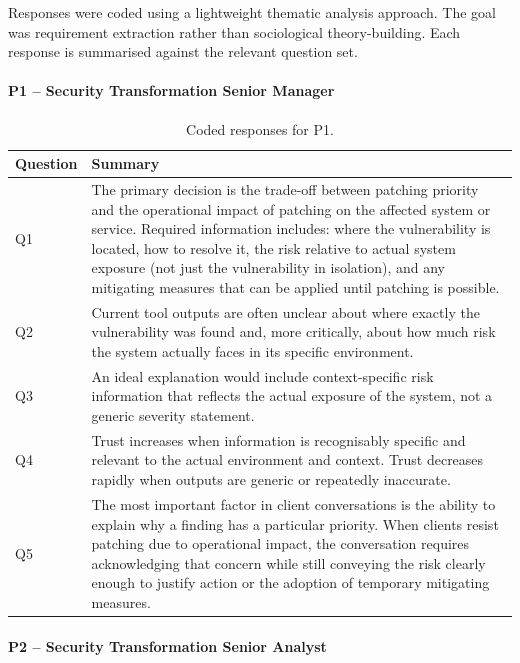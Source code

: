 Responses were coded using a lightweight thematic analysis approach. The goal was requirement extraction rather than sociological theory-building. Each response is summarised against the relevant question set.

\paragraph{P1 -- Security Transformation Senior Manager}

\begin{table}[h]
\centering
\begin{tabular}{@{}lp{}@{}}
\toprule
\textbf{Question} & \textbf{Summary} \\
\midrule
Q1 & The primary decision is the trade-off between patching priority and the operational impact of patching on the affected system or service. Required information includes: where the vulnerability is located, how to resolve it, the risk relative to actual system exposure (not just the vulnerability in isolation), and any mitigating measures that can be applied until patching is possible. \\
\midrule
Q2 & Current tool outputs are often unclear about where exactly the vulnerability was found and, more critically, about how much risk the system actually faces in its specific environment. \\
\midrule
Q3 & An ideal explanation would include context-specific risk information that reflects the actual exposure of the system, not a generic severity statement. \\
\midrule
Q4 & Trust increases when information is recognisably specific and relevant to the actual environment and context. Trust decreases rapidly when outputs are generic or repeatedly inaccurate. \\
\midrule
Q5 & The most important factor in client conversations is the ability to explain why a finding has a particular priority. When clients resist patching due to operational impact, the conversation requires acknowledging that concern while still conveying the risk clearly enough to justify action or the adoption of temporary mitigating measures. \\
\bottomrule
\end{tabular}
\caption{Coded responses for P1.}
\label{tab:p1-responses}
\end{table}

\paragraph{P2 -- Security Transformation Senior Analyst}

